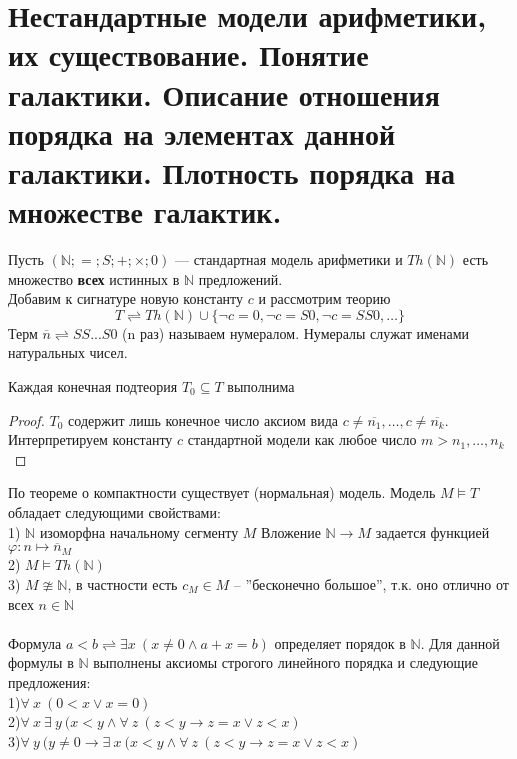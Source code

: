 \section{Нестандартные модели арифметики, их существование. Понятие галактики. Описание отношения порядка на
элементах данной галактики. Плотность порядка на множестве галактик.}
\begin{example}
	Пусть $(\mathbb{N};=;S;+;\times;0)$ — стандартная модель арифметики и $ Th(\mathbb{N}) $ есть множество
	\textbf{всех} истинных в $\mathbb{N}$ предложений.\\
	Добавим к сигнатуре новую константу $c$ и рассмотрим теорию
		$$T \rightleftharpoons Th(\mathbb{N}) \cup \{\neg c=0,\neg c=S0,\neg c=SS0,\ldots \}$$
	Терм $\overline{n} \rightleftharpoons SS...S0$ (n раз) называем нумералом. Нумералы служат именами натуральных
	чисел. 
\end{example}
\begin{proposition}
	Каждая конечная подтеория $T_0\subseteq T$ выполнима
\end{proposition}
\begin{proof}
	$T_0$ содержит лишь конечное число аксиом вида
	$c \neq \overline{n_1} ,\ldots, c \neq \overline{n_k}$. Интерпретируем константу $c$ стандартной модели как
	любое число $m > n_1,\ldots,n_k$
\end{proof}
По теореме о компактности существует (нормальная) модель. Модель $M\models T$ обладает
следующими свойствами:\\
1) $\mathbb{N}$ изоморфна начальному сегменту $M$
Вложение $\mathbb{N} \rightarrow M$ задается функцией $\varphi: n \mapsto \overline{n}_M$\\
2) $M \models Th(\mathbb{N})$\\
3) $M\ncong \mathbb{N}$, в частности есть  $c_M \in M$ -- ''бесконечно большое'', т.к. оно отлично от
всех $n \in \mathbb{N}$
\\\\
Формула $a<b\rightleftharpoons \exists x\:( x \neq 0 \wedge  a+x=b)$  определяет порядок в $\mathbb{N}$. Для данной
формулы в $\mathbb{N}$ выполнены аксиомы строгого линейного порядка и следующие предложения:\\
1)$\forall \: x \:(0<x \lor x=0) $\\
2)$\forall \: x \: \exists \: y \: (x<y\wedge \forall \: z\: (z<y\rightarrow z=x \lor z<x)$\\
3)$\forall\: y\: (y \neq 0 \rightarrow \exists \:x\:(x<y \wedge \forall\: z\:(z<y \rightarrow z=x \lor z<x)$\\

